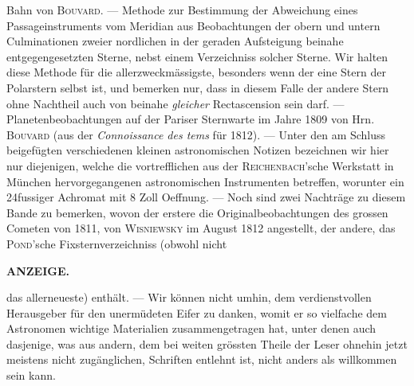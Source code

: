 Bahn von \textsc{Bouvard}. — Methode zur Bestimmung der Abweichung eines Passageinstruments vom Meridian aus Beobachtungen der obern und untern Culminationen zweier nordlichen in der geraden Aufsteigung beinahe entgegengesetzten Sterne, nebst einem Verzeichniss solcher Sterne. Wir halten diese Methode für die allerzweckmässigste, besonders wenn der eine Stern der Polarstern selbst ist, und bemerken nur, dass in diesem Falle der andere Stern ohne Nachtheil auch von beinahe \emph{gleicher} Rectascension sein darf. — Planetenbeobachtungen auf der Pariser Sternwarte im Jahre 1809 von Hrn. \textsc{Bouvard} (aus der \emph{Connoissance des tems} für 1812). — Unter den am Schluss beigefügten verschiedenen kleinen astronomischen Notizen bezeichnen wir hier nur diejenigen, welche die vortrefflichen aus der \textsc{Reichenbach}'sche Werkstatt in München hervorgegangenen astronomischen Instrumenten betreffen, worunter ein 24fussiger Achromat mit 8 Zoll Oeffnung. — Noch sind zwei Nachträge zu diesem Bande zu bemerken, wovon der erstere die Originalbeobachtungen des grossen Cometen von 1811, von \textsc{Wisniewsky} im August 1812 angestellt, der andere, das \textsc{Pond}'sche Fixsternverzeichniss (obwohl nicht\par
{}
\clearpage
\thispagestyle{empty}
\noindent{}%
%
\parbox[t]{\dimexpr\linewidth-24mm\relax}{\centering\footnotesize\bfseries ANZEIGE.\par}%
\makebox[12mm][r]{}\par\nobreak\medskip
\noindent das allerneueste) enthält. — Wir können nicht umhin, dem verdienstvollen Herausgeber für den unermüdeten Eifer zu danken, womit er so vielfache dem Astronomen wichtige Materialien zusammengetragen hat, unter denen auch dasjenige, was aus andern, dem bei weiten grössten Theile der Leser ohnehin jetzt meistens nicht zugänglichen, Schriften entlehnt ist, nicht anders als willkommen sein kann.
